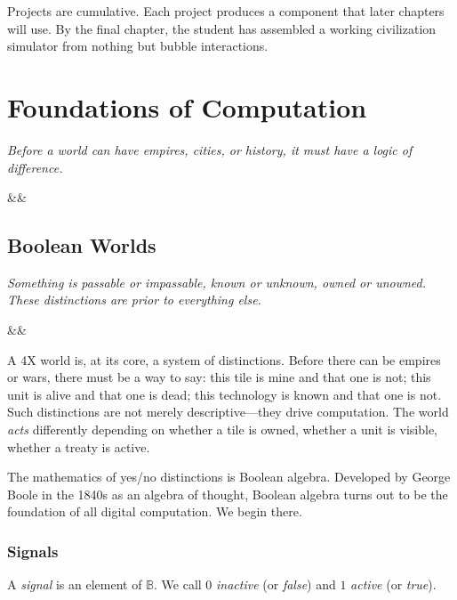 \documentclass[11pt,a4paper,openany]{book}
\theoremstyle{plain}
\theoremstyle{definition}
\theoremstyle{remark}
\newenvironment{background}{%
  \begin{mdframed}[
    linecolor=sphereblue!40, backgroundcolor=sphereblue!5,
    linewidth=1pt, innertopmargin=8pt, innerbottommargin=8pt,
    innerleftmargin=10pt, innerrightmargin=10pt,
    skipabove=10pt, skipbelow=6pt
  ]%
  \setlength{\parindent}{0pt}%
  \noindent{\textcolor{sphereblue}{\textbf{Background}}}\par\smallskip\ignorespaces
}{\end{mdframed}}
\newenvironment{defbox}[1]{%
  \begin{tcolorbox}[
    title={\textbf{Definition:} #1},
    colback=defbg,
    colframe=sphereamber!80,
    fonttitle=\bfseries,
    coltitle=sphereamber!60!black,
    sharp corners,
    breakable,
    before upper={\normalfont\setlength{\parindent}{0pt}\tolerance=9999\hbadness=9999}
  ]
}{\end{tcolorbox}}
\newcommand{\bool}{\mathbb{B}}
\newcommand{\chapterquote}[2]{%
  \par\vspace{0.8em}%
  \begin{flushright}%
    \begin{minipage}{0.65\textwidth}%
      {\itshape #1\par}%
      \ifx&#2&\else\vspace{0.3em}{\raggedleft\small--- #2\par}\fi%
    \end{minipage}%
  \end{flushright}%
  \vspace{0.8em}\par\noindent}
\begin{document}
Projects are cumulative. Each project produces a component that later
chapters will use. By the final chapter, the student has assembled a
working civilization simulator from nothing but bubble interactions.

\tableofcontents

\mainmatter


\part{Foundations of Computation}

\chapterquote{Before a world can have empires, cities, or history, it must
  have a logic of difference.
}{}

\chapter{Boolean Worlds}
\label{ch:boolean}

\chapterquote{Something is passable or impassable, known or unknown,
  owned or unowned. These distinctions are prior to everything else.
}{}

\begin{background}
  A 4X world is, at its core, a system of distinctions. Before there can
  be empires or wars, there must be a way to say: this tile is mine and
  that one is not; this unit is alive and that one is dead; this technology
  is known and that one is not. Such distinctions are not merely
  descriptive---they drive computation. The world \emph{acts} differently
  depending on whether a tile is owned, whether a unit is visible, whether
  a treaty is active.

  The mathematics of yes/no distinctions is Boolean algebra. Developed by
  George Boole in the 1840s as an algebra of thought, Boolean algebra turns
  out to be the foundation of all digital computation. We begin there.
\end{background}

\section{Signals}

\begin{defbox}{Signal}
  A \emph{signal} is an element of $\bool$. We call $0$ \emph{inactive}
  (or \emph{false}) and $1$ \emph{active} (or \emph{true}).
\end{defbox}
\end{document}
